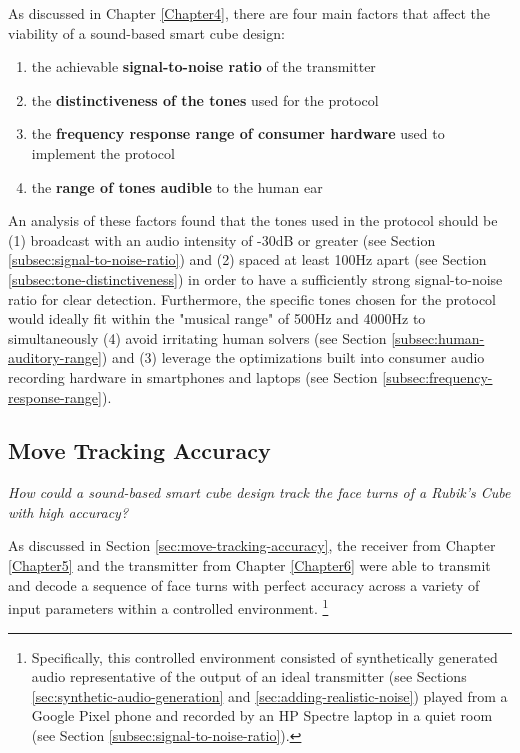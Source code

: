 As discussed in Chapter \ref{Chapter4}, there are four main factors
that affect the viability of a sound-based smart cube design: 

\begin{enumerate}
    \item the achievable \textbf{signal-to-noise ratio} of the transmitter
    \item the \textbf{distinctiveness of the tones} used for the protocol
    \item the \textbf{frequency response range of consumer hardware} used to implement the protocol
    \item the \textbf{range of tones audible} to the human ear
\end{enumerate}

An analysis of these factors found that the tones used in the protocol
should be (1) broadcast with an audio intensity of -30dB or greater
(see Section \ref{subsec:signal-to-noise-ratio}) and (2) spaced at
least 100Hz apart (see Section \ref{subsec:tone-distinctiveness}) in
order to have a sufficiently strong signal-to-noise ratio for clear
detection. Furthermore, the specific tones chosen for the protocol
would ideally fit within the "musical range" of 500Hz and 4000Hz to
simultaneously (4) avoid irritating human solvers (see Section
\ref{subsec:human-auditory-range}) and (3) leverage the optimizations
built into consumer audio recording hardware in smartphones and laptops
(see Section \ref{subsec:frequency-response-range}).

\subsection{Move Tracking Accuracy}
\label{subsec:answer-accuracy}

\emph{How could a sound-based smart cube design track the face turns of
a Rubik's Cube with high accuracy?}

As discussed in Section \ref{sec:move-tracking-accuracy}, the receiver
from Chapter \ref{Chapter5} and the transmitter from Chapter
\ref{Chapter6} were able to transmit and decode a sequence of face
turns with perfect accuracy across a variety of input parameters within
a controlled environment. \footnote{Specifically, this controlled
environment consisted of synthetically generated audio representative
of the output of an ideal transmitter (see Sections
\ref{sec:synthetic-audio-generation} and
\ref{sec:adding-realistic-noise}) played from a Google Pixel phone and
recorded by an HP Spectre laptop in a quiet room (see Section
\ref{subsec:signal-to-noise-ratio}).}

